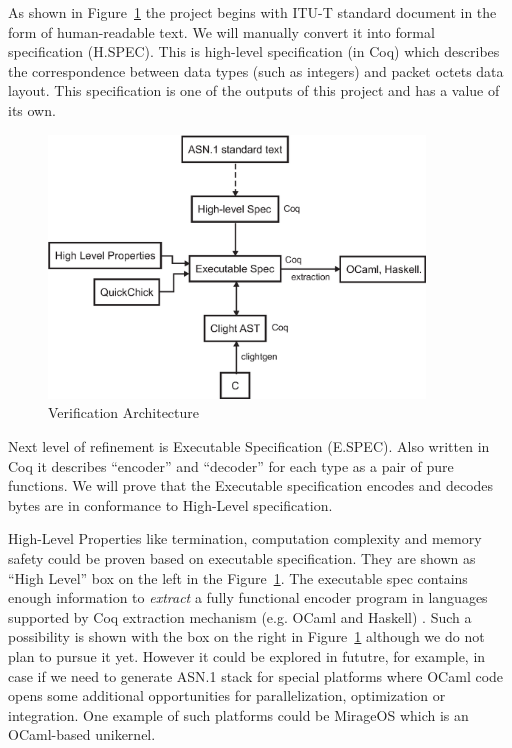 \documentclass[acmsmall,nonacm]{acmart}
\begin{document}
As shown in Figure~\ref{fig:components} the project begins with ITU-T
standard document in the form of human-readable text. We will manually
convert it into formal specification (H.SPEC). This is high-level
specification (in Coq) which describes the correspondence between data
types (such as integers) and packet octets data layout. This
specification is one of the outputs of this project and has a value of
its own.

\begin{figure}[h!]
  \centering
  \includegraphics[width=10cm]{VerificationArchitectureDiagram.eps}
  \caption{Verification Architecture}
  \label{fig:components}
\end{figure}

Next level of refinement is Executable Specification (E.SPEC). Also
written in Coq it describes ``encoder'' and ``decoder'' for each type
as a pair of pure functions. We will prove that the Executable
specification encodes and decodes bytes are in conformance to High-Level
specification.

High-Level Properties like termination, computation complexity and
memory safety could be proven based on executable specification. They
are shown as ``High Level'' box on the left in the
Figure~\ref{fig:components}. The executable spec contains enough
information to \textit{extract} a fully functional encoder program in
languages supported by Coq extraction mechanism (e.g. OCaml and
Haskell) \cite{Extraction}. Such a possibility is shown with the box
on the right in Figure~\ref{fig:components} although we do not plan to
pursue it yet. However it could be explored in fututre, for example,
in case if we need to generate ASN.1 stack for special platforms where
OCaml code opens some additional opportunities for parallelization,
optimization or integration. One example of such platforms could be
MirageOS \cite{MirageOS} which is an OCaml-based unikernel.
\end{document}
